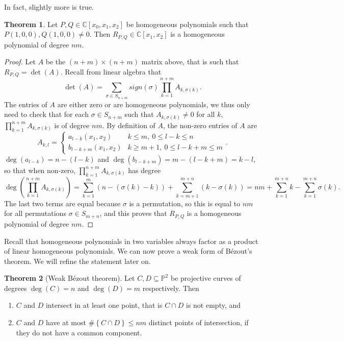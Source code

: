\documentclass{article}
\newcommand{\C}{\mathbb{C}}
\renewcommand{\P}{\mathbb{P}}
\newcommand{\rb}[1]{\left( #1 \right)}
\renewcommand{\sb}[1]{\left[ #1 \right]}
\newcommand{\cb}[1]{\left\{ #1 \right\}}
\theoremstyle{definition}\newtheorem{definition}{Definition}[section]
\theoremstyle{definition}\newtheorem{notation}[definition]{Notation}
\theoremstyle{definition}\newtheorem{remark}[definition]{Remark}
\theoremstyle{definition}\newtheorem{example}[definition]{Example}
\theoremstyle{definition}\newtheorem{fact}{Fact}
\theoremstyle{definition}\newtheorem{exercise}{Exercise}
\newtheorem{theorem}[definition]{Theorem}
\begin{document}
In fact, slightly more is true.

\begin{theorem}
\label{thm:9.7}
Let $ P, Q \in \C\sb{x_0, x_1, x_2} $ be homogeneous polynomials such that $ P\rb{1, 0, 0}, Q\rb{1, 0, 0} \ne 0 $. Then $ R_{P, Q} \in \C\sb{x_1, x_2} $ is a homogeneous polynomial of degree $ nm $.
\end{theorem}

\begin{proof}
Let $ A $ be the $ \rb{n + m} \times \rb{n + m} $ matrix above, that is such that $ R_{P, Q} = \det\rb{A} $. Recall from linear algebra that
$$ \det\rb{A} = \sum_{\sigma \in S_{n + m}} sign\rb{\sigma}\prod_{k = 1}^{n + m}A_{k, \sigma\rb{k}}. $$
The entries of $ A $ are either zero or are homogeneous polynomials, we thus only need to check that for each $ \sigma \in S_{n + m} $ such that $ A_{k, \sigma\rb{k}} \ne 0 $ for all $ k $, $ \prod_{k = 1}^{n + m} A_{k, \sigma\rb{k}} $ is of degree $ nm $. By definition of $ A $, the non-zero entries of $ A $ are
$$ A_{k, l} = \begin{cases} a_{l - k}\rb{x_1, x_2} & k \le m, \ 0 \le l - k \le n \\ b_{l - k + m}\rb{x_1, x_2} & k \ge m + 1, \ 0 \le l - k + m \le m \end{cases}. $$
$ \deg\rb{a_{l - k}} = n - \rb{l - k} $ and $ \deg\rb{b_{l - k + m}} = m - \rb{l - k + m} = k - l $, so that when non-zero, $ \prod_{k = 1}^{n + m} A_{k, \sigma\rb{k}} $ has degree
$$ \deg\rb{\prod_{k = 1}^{n + m} A_{k, \sigma\rb{k}}} = \sum_{k = 1}^m \rb{n - \rb{\sigma\rb{k} - k}} + \sum_{k = m + 1}^{m + n} \rb{k - \sigma\rb{k}} = nm + \sum_{k = 1}^{m + n} k - \sum_{k = 1}^{m + n} \sigma\rb{k}. $$
The last two terms are equal because $ \sigma $ is a permutation, so this is equal to $ nm $ for all permutations $ \sigma \in S_{m + n} $, and this proves that $ R_{P, Q} $ is a homogeneous polynomial of degree $ nm $.
\end{proof}

Recall that homogeneous polynomials in two variables always factor as a product of linear homogeneous polynomials. We can now prove a weak form of Bézout's theorem. We will refine the statement later on.

\begin{theorem}[Weak Bézout theorem]
\label{thm:9.8}
Let $ C, D \subseteq \P^2 $ be projective curves of degrees $ \deg\rb{C} = n $ and $ \deg\rb{D} = m $ respectively. Then
\begin{enumerate}
\item $ C $ and $ D $ intersect in at least one point, that is $ C \cap D $ is not empty, and
\item $ C $ and $ D $ have at most $ \#\cb{C \cap D} \le nm $ distinct points of intersection, if they do not have a common component.
\end{enumerate}
\end{theorem}
\end{document}
